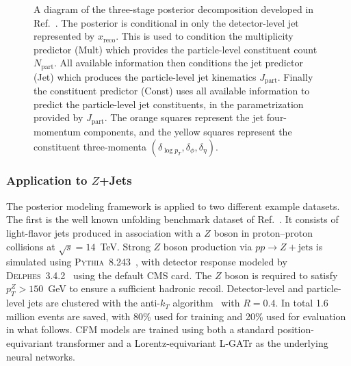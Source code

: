 \begin{figure}[tb]
  \centering
  \begingroup
  \def\xp{x_\text{part}}%
  \def\xr{x_\text{reco}}%
  \def\Npart{N_\text{part}}%
  \def\Ndet{N_\text{reco}}%
  \def\Jpart{J_\text{part}}%
  \def\Jdet{J_\text{reco}}%
  \scalebox{0.82}{}
  \endgroup
  \caption{A diagram of the three-stage posterior decomposition developed in Ref.~\cite{Petitjean:2025tgk}.
  The posterior is conditional in only the detector-level jet represented by $x_\text{reco}$.
  This is used to condition the multiplicity predictor (Mult) which provides the particle-level constituent count $N_\text{part}$.
  All available information then conditions the jet predictor (Jet) which produces the particle-level jet kinematics $J_\text{part}$.
  Finally the constituent predictor (Const) uses all available information to predict the particle-level jet constituents, in the parametrization provided by $J_\text{part}$.
  The orange squares represent the jet four-momentum components, and the yellow squares represent the constituent three-momenta $(\delta_{\log p_T}, \delta_\phi, \delta_\eta)$.}
  \label{fig:cfm_model}
\end{figure}

\subsubsection{Application to \texorpdfstring{$Z$}{Z}+Jets}

The posterior modeling framework is applied to two different example datasets.
The first is the well known unfolding benchmark dataset of Ref.~\cite{Andreassen:2019cjw}.
It consists of light-flavor jets produced in association with a $Z$ boson in proton--proton collisions at $\sqrt{s} = 14$~TeV.
Strong $Z$ boson production via $pp \to Z + \text{jets}$ is simulated using \textsc{Pythia}~8.243~\cite{Sjostrand:2014zea}, with detector response modeled by \textsc{Delphes}~3.4.2~\cite{deFavereau:2013fsa} using the default CMS card.
The $Z$ boson is required to satisfy $p_T^Z > 150$~GeV to ensure a sufficient hadronic recoil.
Detector-level and particle-level jets are clustered with the anti-$k_T$ algorithm~\cite{Cacciari:2008gp} with $R = 0.4$.
In total 1.6 million events are saved, with 80\% used for training and 20\% used for evaluation in what follows.
CFM models are trained using both a standard position-equivariant transformer and a Lorentz-equivariant L-GATr as the underlying neural networks.

